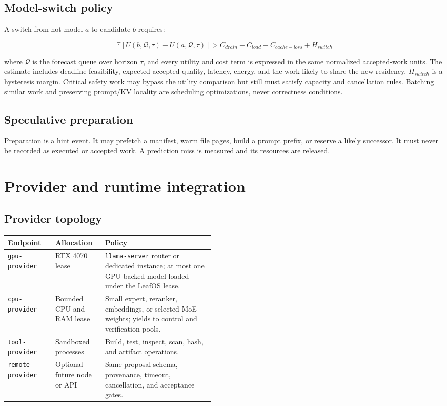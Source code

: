 \documentclass[11pt,letterpaper]{article}
\newcommand{\code}[1]{\texttt{#1}}
\begin{document}
\subsection{Model-switch policy}

A switch from hot model \(a\) to candidate \(b\) requires:

\[
\mathbb{E}
\left[U(b,\mathcal{Q},\tau)-U(a,\mathcal{Q},\tau)\right]
>
C_{drain}+C_{load}+C_{cache-loss}+H_{switch}
\]

where \(\mathcal{Q}\) is the forecast queue over horizon \(\tau\), and every
utility and cost term is expressed in the same normalized accepted-work units.
The estimate includes deadline feasibility, expected accepted quality, latency,
energy, and the work likely to share the new residency. \(H_{switch}\) is a
hysteresis margin. Critical safety work may bypass the utility comparison but
still must satisfy capacity and cancellation rules.
Batching similar work and preserving prompt/KV locality are scheduling
optimizations, never correctness conditions.

\subsection{Speculative preparation}

Preparation is a hint event. It may prefetch a manifest, warm file pages, build
a prompt prefix, or reserve a likely successor. It must never be recorded as
executed or accepted work. A prediction miss is measured and its resources are
released.

\section{Provider and runtime integration}

\subsection{Provider topology}

\begin{tabularx}{\linewidth}{@{}L{0.23\linewidth}L{0.24\linewidth}Y@{}}
\toprule
\textbf{Endpoint} & \textbf{Allocation} & \textbf{Policy} \\
\midrule
\code{gpu-provider} &
RTX 4070 lease &
\code{llama-server} router or dedicated instance; at most one GPU-backed model
loaded under the LeafOS lease. \\
\code{cpu-provider} &
Bounded CPU and RAM lease &
Small expert, reranker, embeddings, or selected MoE weights; yields to control
and verification pools. \\
\code{tool-provider} &
Sandboxed processes &
Build, test, inspect, scan, hash, and artifact operations. \\
\code{remote-provider} &
Optional future node or API &
Same proposal schema, provenance, timeout, cancellation, and acceptance gates. \\
\bottomrule
\end{tabularx}
\end{document}
